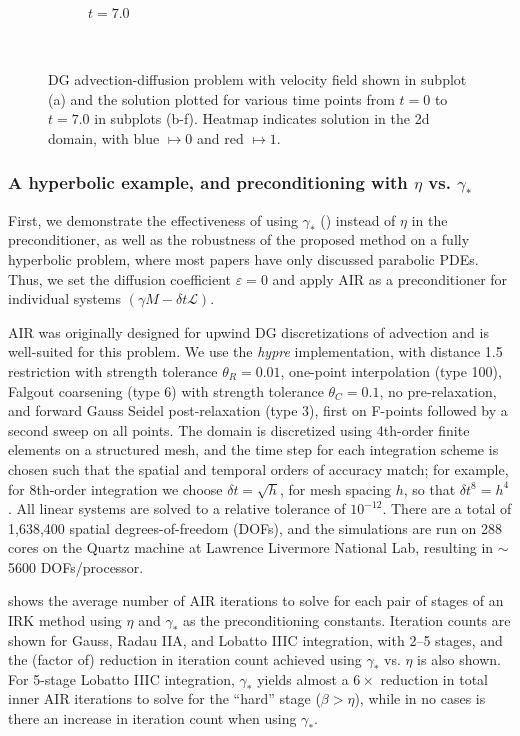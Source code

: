 \documentclass[a4paper,10pt]{article}
\begin{document}
\begin{figure}[!htb]
\begin{subfigure}[b]{0.3\textwidth}
    \caption{$t = 7.0$}
  \end{subfigure}
  \\\vspace{2ex}
      \caption{DG advection-diffusion problem with velocity field shown in
      subplot (a) and the solution plotted for various time points from
      $t=0$ to $t = 7.0$ in subplots (b-f). Heatmap indicates solution in the
      2d domain, with blue $\mapsto 0$ and red $\mapsto 1$.}
  \label{fig:ad_advdiff}
\end{figure}

\subsubsection{A hyperbolic example, and preconditioning with $\eta$ vs. $\gamma_*$}
\label{sec:numerics:dg:const}

First, we demonstrate the effectiveness of using $\gamma_*$ ()
instead of $\eta$ in the preconditioner, as well as the robustness of the proposed
method on a fully hyperbolic problem, where most papers have only discussed parabolic
PDEs. Thus, we set the diffusion coefficient $\varepsilon = 0$
and apply AIR as a preconditioner for individual systems
$(\gamma M - \delta t\mathcal{L})$.

AIR was originally designed for upwind DG discretizations of advection
and is well-suited for this problem. We use the \textit{hypre} implementation,
with distance 1.5 restriction with strength tolerance $\theta_R=0.01$, one-point
interpolation (type 100), Falgout coarsening (type 6) with strength tolerance
$\theta_C=0.1$, no pre-relaxation, and forward Gauss Seidel
post-relaxation (type 3), first on F-points followed by a second sweep on
all points. The domain is discretized using 4th-order finite elements on a
structured mesh, and the time step for each integration scheme is chosen
such that the spatial and temporal orders of accuracy match; for example,
for 8th-order integration we choose $\delta t = \sqrt{h}$, for mesh spacing
$h$, so that $\delta t^8 = h^4$. All linear systems are solved to a relative
tolerance of $10^{-12}$. There are a total of 1,638,400 spatial degrees-of-freedom
(DOFs), and the simulations are run on 288 cores on the Quartz machine at
Lawrence Livermore National Lab, resulting in $\sim$5600 DOFs/processor.

 shows the average number of AIR iterations to solve for
each pair of stages of an IRK method using $\eta$ and $\gamma_*$ as the preconditioning
constants. Iteration counts are shown for Gauss, Radau IIA, and Lobatto IIIC integration,
with 2--5 stages, and the (factor of) reduction in iteration count achieved using $\gamma_*$
vs. $\eta$ is also shown. For 5-stage Lobatto IIIC integration, $\gamma_*$ yields
almost a $6\times$ reduction in total inner AIR iterations to solve for the
``hard'' stage ($\beta > \eta$), while in no cases is there an increase in
iteration count when using $\gamma_*$.
\end{document}
